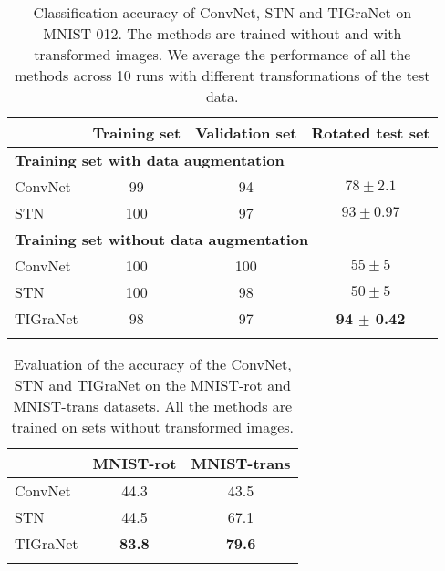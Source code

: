\documentclass[10pt,journal,compsoc]{IEEEtran}
\begin{document}
	\begin{table}[t!]
		\centering
		\begin{tabularx}{\linewidth}{ X c c c }
			\toprule
			& \scriptsize{Training set} & \scriptsize{Validation set}  & \scriptsize{Rotated test set} \\
			\midrule
			\multicolumn{4}{l}{\scriptsize{\bf{Training set with data augmentation}}}\\
			\qquad ConvNet &  99  &  94 &  $ 78 \pm 2.1$   \\
			\qquad STN & 100  &  97 & $ 93 \pm 0.97$   \\
			\midrule
			\multicolumn{4}{l}{\scriptsize{\bf{Training set without data augmentation}}}\\
			\qquad ConvNet & 100  &  100 &  $ 55 \pm 5$   \\
			\qquad STN & 100  &  98 & $ 50 \pm 5$   \\
			\qquad  TIGraNet & 98  &  97 & \bf{ 94 $\pm$ 0.42 }   \\
			\bottomrule
			\\
		\end{tabularx}
		\caption{Classification accuracy of ConvNet, STN and TIGraNet on MNIST-012. The methods are trained without and with transformed images. We average the performance of all the methods across 10 runs with different transformations of the test data.}
		\label{tab:comparison}
	\end{table}
	\begin{table}[t!]
		\centering
		\begin{tabularx}{\linewidth}{ X c c }
			\toprule
			& \scriptsize{MNIST-rot} & \scriptsize{MNIST-trans} \\
			\midrule
			\qquad ConvNet & 44.3 & 43.5  \\
			\qquad STN &  44.5 & 67.1 \\
			\qquad TIGraNet &  \bf{83.8} & \bf{79.6} \\
			\bottomrule
			\\
		\end{tabularx}
		\caption{Evaluation of the accuracy of the ConvNet, STN and TIGraNet on the MNIST-rot and MNIST-trans datasets. All the methods are trained on sets without transformed images.}
		\label{tab:all_digit}
	\end{table}
\end{document}
